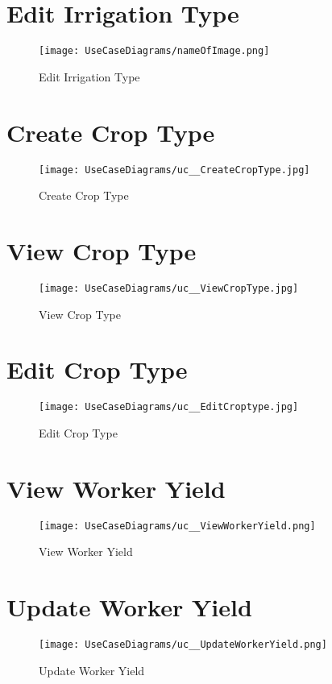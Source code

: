\documentclass[11pt,fleqn]{book} %
\begin{document}
	\section{Edit Irrigation Type}
	\begin{figure}
		\texttt{[image: UseCaseDiagrams/nameOfImage.png]}
		\caption{Edit Irrigation Type}
	\end{figure}
	
	\section{Create Crop Type}
	\begin{figure}
		\texttt{[image: UseCaseDiagrams/uc\_\_CreateCropType.jpg]}
		\caption{Create Crop Type}
	\end{figure}
	
	\section{View Crop Type}
	\begin{figure}
		\texttt{[image: UseCaseDiagrams/uc\_\_ViewCropType.jpg]}
		\caption{View Crop Type}
	\end{figure}
	
	\section{Edit Crop Type}
	\begin{figure}
		\texttt{[image: UseCaseDiagrams/uc\_\_EditCroptype.jpg]}
		\caption{Edit Crop Type}
	\end{figure}
	
	\section{View Worker Yield}
	\begin{figure}
		\texttt{[image: UseCaseDiagrams/uc\_\_ViewWorkerYield.png]}
		\caption{View Worker Yield}
	\end{figure}
	
	\section{Update Worker Yield}
	\begin{figure}
		\texttt{[image: UseCaseDiagrams/uc\_\_UpdateWorkerYield.png]}
		\caption{Update Worker Yield}
	\end{figure}
	
\end{document}
